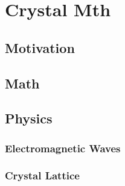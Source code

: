 %
%
%
\chapter{Crystal Mth\label{chapter:punktgruppen}}
\begin{refsection}



\section{Motivation}

\section{Math}

\section{Physics}
\subsection{Electromagnetic Waves}
\subsection{Crystal Lattice}



\printbibliography[heading=subbibliography]
\end{refsection}
